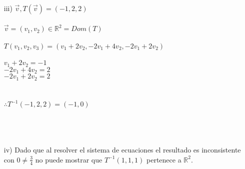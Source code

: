 \documentclass[a4paper,10pt]{article}
\begin{document}
\begin{enumerate}
\begin{enumerate}
\begin{enumerate}
        \item [iii)] $\vec{v},T(\vec{v})=(-1,2,2)$\\\\
                     $\vec{v}=(v_{1},v_{2}) \in \mathds{R}^2=Dom(T)$ \\\\
                     $T(v_{1},v_{2},v_{3})=(v_{1}+2v_{2},-2v_{1}+4v_{2},-2v_{1}+2v_{2})$\\\\
                     $v_{1}+2v_{2}=-1$\hspace{.7cm}{\textcolor{yellow}{....1}} \\
                     $-2v_{1}+4v_{2}=2$\hspace{.5cm}{\textcolor{yellow}{....2}} \\ 
                     $-2v_{1}+2v_{2}=2$\hspace{.5cm}{\textcolor{yellow}{....3}}\\
                     \\
                     \\
                     \textcolor{persianrose}{$\therefore T^{-1}(-1,2,2)=(-1,0)$}\\
                     \\
                     \\\\




        \item [iv)] \textcolor{persianrose}{Dado que al resolver el sistema de ecuaciones el resultado es inconsistente con $0 \neq \frac{3}{4}$ no puede mostrar que $T^{-1}(1,1,1)$ pertenece a $\mathds{R}^{2}$.}\\
        

\end{enumerate}
\end{enumerate}
\end{enumerate}
\end{document}
